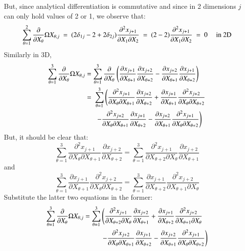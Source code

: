 \documentclass{warpdoc}
\newcommand{\alb}{\vspace{0.2cm}\\} %
\newcommand{\mfd}{\displaystyle}
\begin{document}
%
But, since analytical differentiation is commutative and since
in 2 dimensions $j$ can only hold values of 2 or 1, we observe that:
%
\begin{equation}
  \sum_{\theta=1}^2   \frac{\partial}{\partial X_\theta}\Omega X_{\theta,j} 
  ~=~(2\delta_{1 j}-2+2\delta_{2 j}) \frac{\partial^2 x_{j+1}}{\partial X_1 \partial X_{2}}
  ~=~(2-2) \frac{\partial^2 x_{j+1}}{\partial X_1 \partial X_{2}}
  ~=~0 {\rm ~~~~~in~2D}
\label{eqn:invariant1-2D}
\end{equation}
%
Similarly in 3D,
%
\begin{align}
  \sum_{\theta=1}^3   \frac{\partial}{\partial X_\theta}\Omega X_{\theta,j}  &=
      \mfd\sum_{\theta=1}^3 \frac{\partial}{\partial X_\theta}
                         \left( \mfd\frac{\partial x_{j+1}}{\partial X_{\theta+1}}
                                \mfd\frac{\partial x_{j+2}}{\partial X_{\theta+2}}
                               -\mfd\frac{\partial x_{j+2}}{\partial X_{\theta+1}}
                                \mfd\frac{\partial x_{j+1}}{\partial X_{\theta+2}} \right)\alb
  &=~  \mfd\sum_{\theta=1}^3
   \left(
     \frac{\partial^2 x_{j+1}}{\partial X_\theta \partial X_{\theta+1}} \frac{\partial x_{j+2}}{\partial X_{\theta+2}}
    +\frac{\partial x_{j+1}}{\partial X_{\theta+1}} \frac{\partial^2 x_{j+2}}{\partial X_\theta \partial X_{\theta+2}}
    \right.\nonumber\alb
    &\left. ~~~~~~-\frac{\partial^2 x_{j+2}}{\partial X_\theta \partial X_{\theta+1}} \frac{\partial x_{j+1}}{\partial X_{\theta+2}}
    -\frac{\partial x_{j+2}}{\partial X_{\theta+1}} \frac{\partial^2 x_{j+1}}{\partial X_\theta \partial X_{\theta+2}}
   \right) \nonumber
\end{align}
%
But, it should be clear that:
%
\begin{equation}
  \sum_{\theta=1}^3 \frac{\partial^2 x_{j+1}}{\partial X_\theta \partial X_{\theta+1}} \frac{\partial x_{j+2}}{\partial X_{\theta+2}}
 =\sum_{\theta=1}^3 \frac{\partial^2 x_{j+1}}{\partial X_{\theta+2} \partial X_{\theta}} \frac{\partial x_{j+2}}{\partial X_{\theta+1}}
\end{equation}
%
and
%
\begin{equation}
  \sum_{\theta=1}^3 \frac{\partial x_{j+1}}{\partial X_{\theta+1}} \frac{\partial^2 x_{j+2}}{\partial X_\theta \partial X_{\theta+2}}
 =\sum_{\theta=1}^3 \frac{\partial x_{j+1}}{\partial X_{\theta+2}} \frac{\partial^2 x_{j+2}}{\partial X_{\theta+1} \partial X_{\theta}}
\end{equation}
%
Substitute the latter two equations  in the former:
%
\begin{align}
\sum_{\theta=1}^3   \frac{\partial}{\partial X_\theta}\Omega{X_{\theta,j} }
  =  \mfd\sum_{\theta=1}^3
   &\left(
     \frac{\partial^2 x_{j+1}}{\partial X_{\theta+2} \partial X_{\theta}} \frac{\partial x_{j+2}}{\partial X_{\theta+1}}
    +\frac{\partial x_{j+1}}{\partial X_{\theta+2}} \frac{\partial^2 x_{j+2}}{\partial X_{\theta+1} \partial X_{\theta}}
   \right. \nonumber\alb\mfd
   &\left.
    -\frac{\partial^2 x_{j+2}}{\partial X_\theta \partial X_{\theta+1}} \frac{\partial x_{j+1}}{\partial X_{\theta+2}}
    -\frac{\partial x_{j+2}}{\partial X_{\theta+1}} \frac{\partial^2 x_{j+1}}{\partial X_\theta \partial X_{\theta+2}}
   \right)
\end{align}
\end{document}
